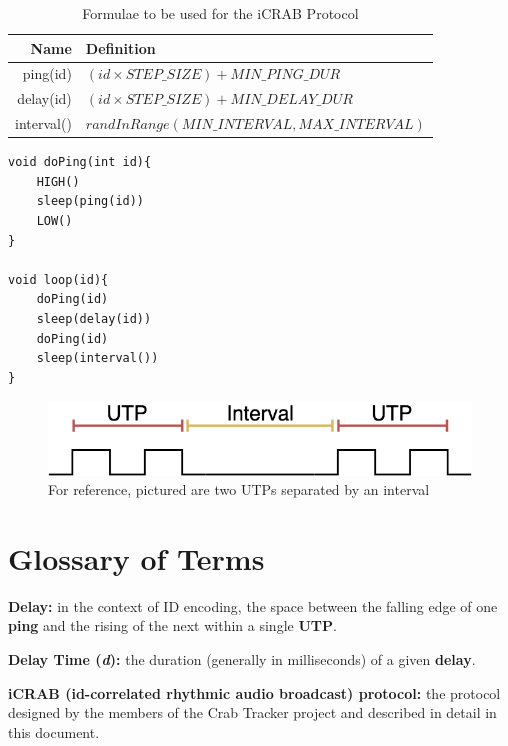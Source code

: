 \documentclass[12pt]{article}
\begin{document}
\begin{table}[ht]
\centering
\begin{tabular}{|r|l|}
\hline
Name & Definition \\
\hline
ping(id)		&	$(id \times STEP\_SIZE)+MIN\_PING\_DUR$	\\
delay(id)	&	$(id \times STEP\_SIZE)+MIN\_DELAY\_DUR$	\\
interval()	&	$randInRange(MIN\_INTERVAL, MAX\_INTERVAL)$	\\
\hline
\end{tabular}
\caption{Formulae to be used for the iCRAB Protocol}\label{table:formulae}
\end{table}


\begin{lstlisting}[caption={Transmitter Behavior},label={lst:tx}]
void doPing(int id){
	HIGH()
	sleep(ping(id))
	LOW()
}

void loop(id){
	doPing(id)
	sleep(delay(id))
	doPing(id)
	sleep(interval())
}
\end{lstlisting}

\begin{figure}[h]
\centering
\includegraphics[scale=0.5]{interval}

\caption{For reference, pictured are two UTPs separated by an interval}
\label{fig:interval}
\end{figure}


\newpage
\appendix
\section{Glossary of Terms} \label{glossary}

{\bf Delay:}
	in the context of ID encoding, the space between the falling edge of one
	{\bf ping} and the rising of the next within a single {\bf UTP}.

{\bf Delay Time ({\em d}):}
	the duration (generally in milliseconds) of a given {\bf delay}.

{\bf iCRAB (id-correlated rhythmic audio broadcast) protocol:}
	the protocol designed by the members of the Crab Tracker project and
	described in detail in this document.
\end{document}
